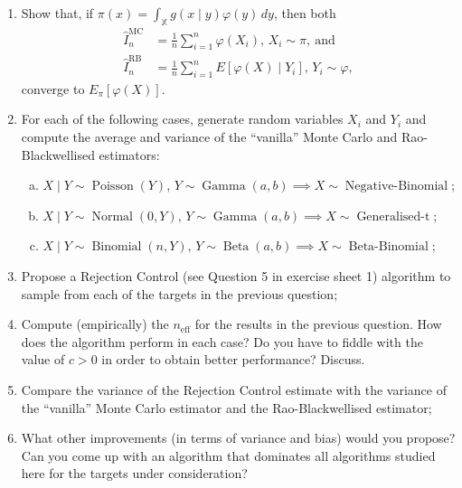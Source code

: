 \documentclass[a4paper,10pt, notitlepage]{report}
\begin{document}
\begin{enumerate}
 \item Show that, if $\pi(x) = \int_{\mathbb{X}} g(x\mid y) \varphi(y)\,dy$, then both
 \begin{align*}
 \hat{I}_n^{\text{MC}} &= \frac{1}{n} \sum_{i=1}^n \varphi(X_i), \, X_i \sim \pi, \: \text{and}\\
 \hat{I}_n^{\text{RB}} &= \frac{1}{n} \sum_{i=1}^n E[\varphi(X) \mid Y_i] , \, Y_i \sim \varphi, 
 \end{align*}
converge to $E_\pi[\varphi(X)]$.
\item For each of the following cases, generate random variables $X_i$ and $Y_i$ and compute the average and variance of the ``vanilla'' Monte Carlo and Rao-Blackwellised estimators:
\begin{enumerate}[(a)]
 \item $X\mid Y \sim \operatorname{Poisson}(Y),\, Y \sim \operatorname{Gamma}(a, b) \implies X \sim \operatorname{Negative-Binomial}$;
  \item $X\mid Y \sim \operatorname{Normal}(0, Y),\, Y \sim \operatorname{Gamma}(a, b) \implies X \sim \operatorname{Generalised-t}$;
   \item $X\mid Y \sim \operatorname{Binomial}(n, Y),\, Y \sim \operatorname{Beta}(a, b) \implies X \sim \operatorname{Beta-Binomial}$;
 \end{enumerate}
 
 \item Propose a Rejection Control (see Question 5 in exercise sheet 1) algorithm to sample from each of the targets in the previous question;
 \item Compute (empirically) the $n_{\text{eff}}$ for the results in the previous question.
 How does the algorithm perform in each case? 
 Do you have to fiddle with the value of $c >0$ in order to obtain better performance?
 Discuss.
 \item Compare the variance of the Rejection Control estimate with the variance of the ``vanilla'' Monte Carlo estimator and the Rao-Blackwellised  estimator;
 \item What other improvements (in terms of variance and bias) would you propose?
 Can you come up with an algorithm that dominates all algorithms studied here for the targets under consideration?
\end{enumerate}

% 
% 
% 
\end{document}
